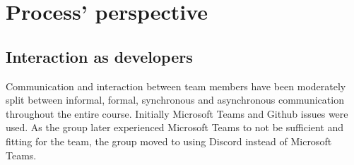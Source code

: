 \section{Process' perspective}






\subsection{Interaction as developers}
Communication and interaction between team members have been moderately split between informal, formal, synchronous and asynchronous communication throughout the entire course. Initially Microsoft Teams and Github issues were used. As the group later experienced Microsoft Teams to not be sufficient and fitting for the team, the group moved to using Discord instead of Microsoft Teams.





